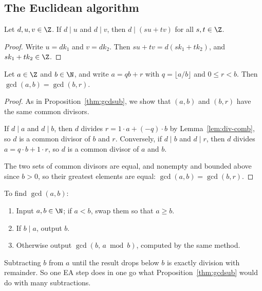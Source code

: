 \subsection{The Euclidean algorithm}
\label{sec:7-6}

\begin{lemma}\label{lem:div-comb}
Let $d,u,v \in \Z$. If $d \mid u$ and $d \mid v$, then $d \mid (su + tv)$ for all $s,t \in \Z$.
\end{lemma}
\begin{proof}
Write $u = dk_1$ and $v = dk_2$. Then $su + tv = d(sk_1 + tk_2)$, and $sk_1 + tk_2 \in \Z$.
\end{proof}

\begin{lemma}\label{lem:euclid-step}
Let $a \in \Z$ and $b \in \N$, and write $a = qb + r$ with $q = \lfloor a/b \rfloor$ and $0 \le r < b$. Then $\gcd(a,b) = \gcd(b,r)$.
\end{lemma}
\begin{proof}
As in Proposition~\ref{thm:gcdsub}, we show that $(a,b)$ and $(b,r)$ have the same common divisors.

If $d\mid a$ and $d\mid b$, then $d$ divides $r = 1\cdot a + (-q)\cdot b$ by Lemma~\ref{lem:div-comb}, so $d$ is a common divisor of $b$ and $r$. Conversely, if $d\mid b$ and $d\mid r$, then $d$ divides $a = q\cdot b + 1\cdot r$, so $d$ is a common divisor of $a$ and $b$.

The two sets of common divisors are equal, and nonempty and bounded above since $b>0$, so their greatest elements are equal: $\gcd(a,b)=\gcd(b,r)$.
\end{proof}

\begin{definition}
To find $\gcd(a,b)$:
\begin{enumerate}
    \item Input $a,b\in\N$; if $a<b$, swap them so that $a\ge b$.
    \item If $b\mid a$, output $b$.
    \item Otherwise output $\gcd(b,\,a\bmod b)$, computed by the same method.
\end{enumerate}
\end{definition}

\begin{note}
Subtracting $b$ from $a$ until the result drops below $b$ is exactly division with remainder. So one EA step does in one go what Proposition~\ref{thm:gcdsub} would do with many subtractions.
\end{note}

